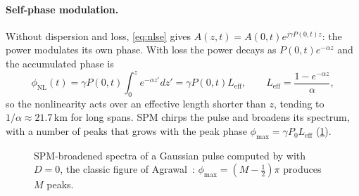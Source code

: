 \paragraph{Self-phase modulation.} Without dispersion and loss, \cref{eq:nlse} gives
$A(z,t)=A(0,t)e^{j\gamma P(0,t)z}$: the power modulates its own phase. With loss the power decays as
$P(0,t)e^{-\alpha z}$ and the accumulated phase is
\begin{equation}
  \phi_{\mathrm{NL}}(t)=\gamma P(0,t)\int_0^ze^{-\alpha z'}dz'=\gamma P(0,t)L_{\mathrm{eff}},\qquad
  L_{\mathrm{eff}}=\frac{1-e^{-\alpha z}}{\alpha},
\end{equation}
so the nonlinearity acts over an effective length shorter than $z$, tending to $1/\alpha\approx21.7$\,km
for long spans. SPM chirps the pulse and broadens its spectrum, with a number of peaks that grows
with the peak phase $\phi_{\max}=\gamma P_0L_{\mathrm{eff}}$ (\cref{fig:spm}).

\begin{figure}[htbp]
\centering
{}
\caption{SPM-broadened spectra of a Gaussian pulse computed by  with $D=0$, the
classic figure of Agrawal~\cite{agrawal2019}: $\phi_{\max}=(M-\frac12)\pi$ produces $M$ peaks.}
\label{fig:spm}
\end{figure}

